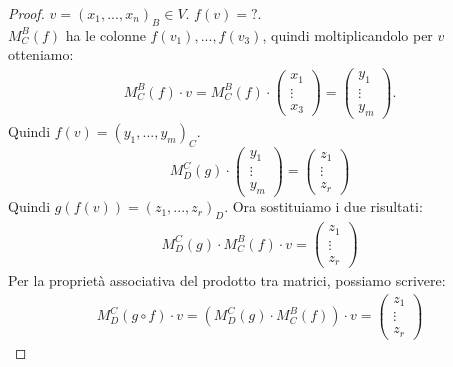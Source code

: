 \documentclass[a4paper]{article}
\theoremstyle{definition}
\begin{document}
\begin{proof}
	$v = (x_1, ..., x_n)_B \in V$. $f(v) = ?$. \\
	$M_C^B(f)$ ha le colonne $f(v_1), ..., f(v_3)$, quindi moltiplicandolo per $v$ otteniamo:
	\begin{align*}
		M_C^B(f) \cdot v = M_C^B(f) \cdot \begin{pmatrix}
			x_1 \\
			\vdots \\
			x_3
		\end{pmatrix} = \begin{pmatrix}
			y_1 \\
			\vdots \\
			y_m
		\end{pmatrix}.
	\end{align*}
	Quindi $f(v) = (y_1, ..., y_m)_C$.
	\[ M_D^C(g) \cdot \begin{pmatrix}
		y_1 \\
		\vdots \\
		y_m
	\end{pmatrix} = \begin{pmatrix}
		z_1 \\
		\vdots \\
		z_r
	\end{pmatrix} \]
	Quindi $g(f(v)) = (z_1, ..., z_r)_D$.
	Ora sostituiamo i due risultati:
	\begin{align*}
		M_D^C(g) \cdot M_C^B(f) \cdot v = \begin{pmatrix}
			z_1 \\
			\vdots \\
			z_r
		\end{pmatrix}
	\end{align*}
	Per la proprietà associativa del prodotto tra matrici, possiamo scrivere:
	\begin{align*}
		M_D^C(g \circ f) \cdot v = (M_D^C(g) \cdot M_C^B(f)) \cdot v = \begin{pmatrix}
			z_1 \\
			\vdots \\
			z_r
		\end{pmatrix}
	\end{align*}
\end{proof}
\end{document}

